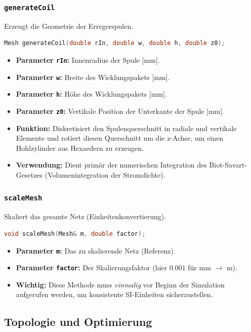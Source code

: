 \documentclass[a4paper,12pt]{article}
\begin{document}
\subsubsection{\texttt{generateCoil}}
Erzeugt die Geometrie der Erregerspulen.
\begin{lstlisting}[language=C++]
Mesh generateCoil(double rIn, double w, double h, double z0);
\end{lstlisting}
\begin{itemize}
    \item \textbf{Parameter \texttt{rIn}:} Innenradius der Spule [mm].
    \item \textbf{Parameter \texttt{w}:} Breite des Wicklungspakets [mm].
    \item \textbf{Parameter \texttt{h}:} Höhe des Wicklungspakets [mm].
    \item \textbf{Parameter \texttt{z0}:} Vertikale Position der Unterkante der Spule [mm].
    \item \textbf{Funktion:} Diskretisiert den Spulenquerschnitt in radiale und vertikale Elemente und rotiert diesen Querschnitt um die z-Achse, um einen Hohlzylinder aus Hexaedern zu erzeugen.
    \item \textbf{Verwendung:} Dient primär der numerischen Integration des Biot-Savart-Gesetzes (Volumenintegration der Stromdichte).
\end{itemize}

\subsubsection{\texttt{scaleMesh}}
Skaliert das gesamte Netz (Einheitenkonvertierung).
\begin{lstlisting}[language=C++]
void scaleMesh(Mesh& m, double factor);
\end{lstlisting}
\begin{itemize}
    \item \textbf{Parameter \texttt{m}:} Das zu skalierende Netz (Referenz).
    \item \textbf{Parameter \texttt{factor}:} Der Skalierungsfaktor (hier $0.001$ für mm $\to$ m).
    \item \textbf{Wichtig:} Diese Methode muss \textit{einmalig} vor Beginn der Simulation aufgerufen werden, um konsistente SI-Einheiten sicherzustellen.
\end{itemize}

\subsection{Topologie und Optimierung}
\end{document}
